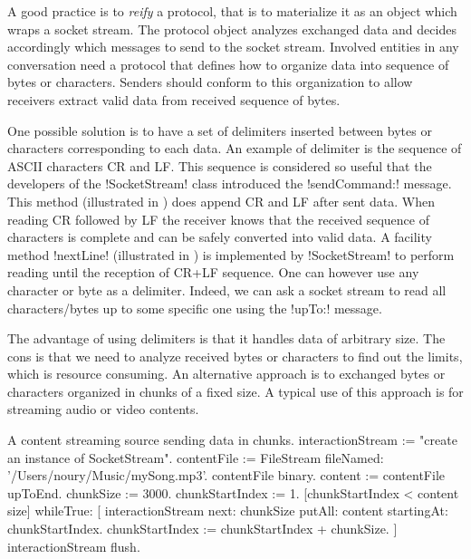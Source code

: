 \documentclass[a4paper,10pt,twoside]{book}
\begin{document}
A good practice is to \emph{reify} a protocol, that is to materialize it as an object which wraps a socket stream. 
The protocol object analyzes exchanged data and decides accordingly which messages to send to the socket stream.
Involved entities in any conversation need a protocol that defines how to organize data into sequence of bytes or characters.
Senders should conform to this organization to allow receivers extract valid data from received sequence of bytes.
 
One possible solution is to have a set of delimiters inserted between bytes or characters corresponding to each data.
An example of delimiter is the sequence of ASCII characters CR and LF.
This sequence is considered so useful that the developers of the \ct!SocketStream! class introduced the \ct!sendCommand:! message.
This method (illustrated in ) does append CR and LF after sent data.
When reading CR followed by LF the receiver knows that the received sequence of characters is complete and can be safely converted into valid data.
A facility method \ct!nextLine! (illustrated in ) is implemented by \ct!SocketStream! to perform reading until the reception of CR+LF sequence.
One can however use any character or byte as a delimiter.
Indeed, we can ask a socket stream to read all characters/bytes up to some specific one using the \ct!upTo:! message.


The advantage of using delimiters is that it handles data of arbitrary size.
The cons is that we need to analyze received bytes or characters to find out the limits, which is resource consuming.
An alternative approach is to exchanged bytes or characters organized in chunks of a fixed size.
A typical use of this approach is for streaming audio or video contents.

\begin{script}{A content streaming source sending data in chunks.}
interactionStream := "create an instance of SocketStream". 
contentFile := FileStream fileNamed: '/Users/noury/Music/mySong.mp3'.
contentFile binary.
content := contentFile upToEnd.
chunkSize := 3000.
chunkStartIndex := 1.
[chunkStartIndex < content size] whileTrue: [
	interactionStream next: chunkSize putAll: content startingAt: chunkStartIndex.
	chunkStartIndex := chunkStartIndex + chunkSize.
]
interactionStream flush.
\end{script}
\end{document}
